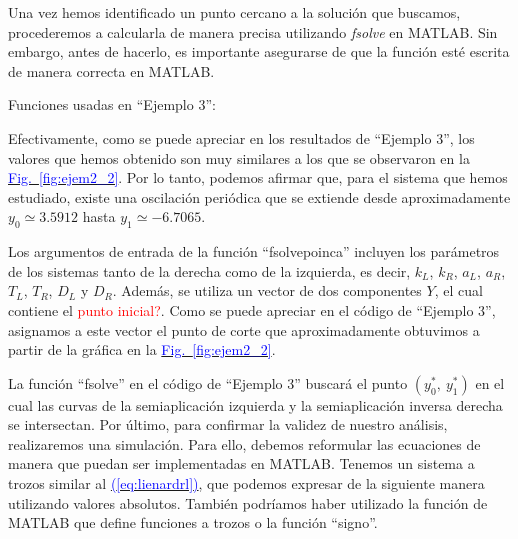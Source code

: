\documentclass[12pt,a4paper]{report} %
\newcommand{\fref}[1]{\hyperref[#1]{\textcolor{blue}{Fig.~\ref*{#1}}}}
\newcommand{\eref}[1]{\hyperref[#1]{\textcolor{blue}{(\ref*{#1})}}}
\newcommand{\fref}[1]{\hyperref[#1]{\textcolor{blue}{\textit{Fig.~\ref*{#1}}}}}
\newcommand{\eref}[1]{\hyperref[#1]{\textcolor{blue}{\textit{(\ref*{#1})}}}}
\begin{document}
	Una vez hemos identificado un punto cercano a la solución que buscamos, procederemos a calcularla de manera precisa utilizando \textit{fsolve} en MATLAB. Sin embargo, antes de hacerlo, es importante asegurarse de que la función esté escrita de manera correcta en MATLAB.
		
	\vspace{1cm}
	
	\vspace{1cm}
	
	\newpage
	
	\noindent Funciones usadas en ``Ejemplo 3'':
	\vspace{0.5cm}
	\vspace{0.5cm}
	
	\vspace{1cm}\noindent Efectivamente, como se puede apreciar en los resultados de ``Ejemplo 3'', los valores que hemos obtenido son muy similares a los que se observaron en la \fref{fig:ejem2_2}. Por lo tanto, podemos afirmar que, para el sistema que hemos estudiado, existe una oscilación periódica que se extiende desde aproximadamente $y_0\simeq3.5912$ hasta $y_1\simeq-6.7065$.

	
	\vspace{0.5cm}Los argumentos de entrada de la función ``fsolvepoinca'' incluyen los parámetros de los sistemas tanto de la derecha como de la izquierda, es decir, $k_L$, $k_R$, $a_L$, $a_R$, $T_L$, $T_R$, $D_L$ y $D_R$. Además, se utiliza un vector de dos componentes $Y$, el cual contiene el \textcolor{red}{punto inicial?}. Como se puede apreciar en el código de ``Ejemplo 3'', asignamos a este vector el punto de corte que aproximadamente obtuvimos a partir de la gráfica en la \fref{fig:ejem2_2}.
	
	
	\vspace{0.5cm}La función ``fsolve'' en el código de ``Ejemplo 3'' buscará el punto $\left(y_0^*,\: y_1^*\right)$ en el cual las curvas de la semiaplicación izquierda y la semiaplicación inversa derecha se intersectan.
	\newpage
	Por último, para confirmar la validez de nuestro análisis, realizaremos una simulación. Para ello, debemos reformular las ecuaciones de manera que puedan ser implementadas en MATLAB. Tenemos un sistema a trozos similar al \eref{eq:lienardrl}, que podemos expresar de la siguiente manera utilizando valores absolutos. También podríamos haber utilizado la función de MATLAB que define funciones a trozos o la función ``signo''.
	
\end{document}
